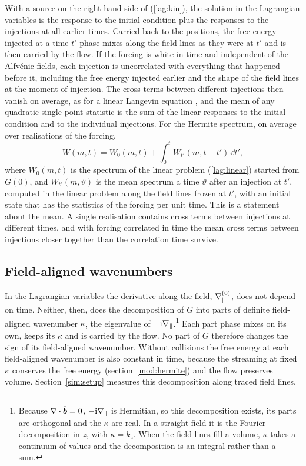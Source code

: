 With a source on the right-hand side of (\ref{lag:kin}), the solution in the Lagrangian variables is the response to the initial condition plus the responses to the injections at all earlier times. Carried back to the positions, the free energy injected at a time $t'$ phase mixes along the field lines as they were at $t'$ and is then carried by the flow. If the forcing is white in time and independent of the Alfv\'enic fields, each injection is uncorrelated with everything that happened before it, including the free energy injected earlier and the shape of the field lines at the moment of injection. The cross terms between different injections then vanish on average, as for a linear Langevin equation \citep{Kanekar2015}, and the mean of any quadratic single-point statistic is the sum of the linear responses to the initial condition and to the individual injections. For the Hermite spectrum, on average over realisations of the forcing,
\begin{equation}\label{lag:meanforced}
  W(m,t)=W_0(m,t)+\int_0^tW_{t'}(m,t-t')\,\dd t' ,
\end{equation}
where $W_0(m,t)$ is the spectrum of the linear problem (\ref{lag:linear}) started from $G(0)$, and $W_{t'}(m,\vartheta)$ is the mean spectrum a time $\vartheta$ after an injection at $t'$, computed in the linear problem along the field lines frozen at $t'$, with an initial state that has the statistics of the forcing per unit time. This is a statement about the mean. A single realisation contains cross terms between injections at different times, and with forcing correlated in time the mean cross terms between injections closer together than the correlation time survive.

\subsection{Field-aligned wavenumbers}\label{fr:kpar}

In the Lagrangian variables the derivative along the field, $\nabla_\parallel^{(0)}$, does not depend on time. Neither, then, does the decomposition of $G$ into parts of definite field-aligned wavenumber $\kappa$, the eigenvalue of $-\mathrm{i}\nabla_\parallel$.\footnote{Because $\nabla\cdot\hat{\boldsymbol b}=0$, $-\mathrm{i}\nabla_\parallel$ is Hermitian, so this decomposition exists, its parts are orthogonal and the $\kappa$ are real. In a straight field it is the Fourier decomposition in $z$, with $\kappa=k_z$. When the field lines fill a volume, $\kappa$ takes a continuum of values and the decomposition is an integral rather than a sum.} Each part phase mixes on its own, keeps its $\kappa$ and is carried by the flow. No part of $G$ therefore changes the sign of its field-aligned wavenumber. Without collisions the free energy at each field-aligned wavenumber is also constant in time, because the streaming at fixed $\kappa$ conserves the free energy (section~\ref{mod:hermite}) and the flow preserves volume. Section~\ref{sim:setup} measures this decomposition along traced field lines.

